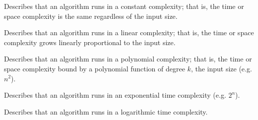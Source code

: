 \documentclass{cslesson}
\numberwithin{equation}{section}
\begin{document}
\begin{definition}
Describes that an algorithm runs in a constant complexity; that is, the time or space complexity is the same regardless of the input size.
\end{definition}

\begin{definition}
Describes that an algorithm runs in a linear complexity; that is, the time or space complexity grows linearly proportional to the input size.
\end{definition}

\begin{definition}
Describes that an algorithm runs in a polynomial complexity; that is, the time or space complexity bound by a polynomial function of degree $k$, the input size (e.g. $n^2$).
\end{definition}

\begin{definition}
Describes that an algorithm runs in an exponential time complexity (e.g. $2^n$).
\end{definition}

\begin{definition}
Describes that an algorithm runs in a logarithmic time complexity.
\end{definition}

\newpage
\end{document}
